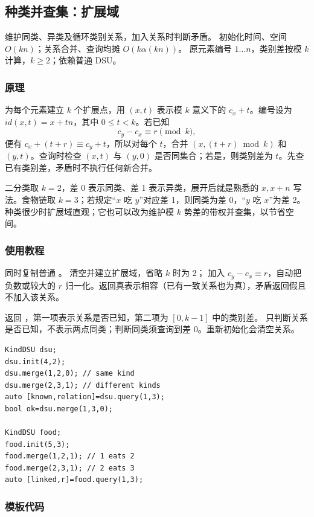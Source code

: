 \subsection{种类并查集：扩展域}
\label{ds:kind-dsu}
\AlgorithmInfo
    {维护同类、异类及循环类别关系，加入关系时判断矛盾。}
    {初始化时间、空间 $O(kn)$；关系合并、查询均摊 $O(k\alpha(kn))$。}
    {原元素编号 $1\ldots n$，类别差按模 $k$ 计算，$k\ge2$；依赖普通 DSU。}
\subsubsection*{原理}
为每个元素建立 $k$ 个扩展点，用 $(x,t)$ 表示模 $k$ 意义下的 $c_x+t$。编号设为 $id(x,t)=x+tn$，其中 $0\le t<k$。若已知
\[
 c_y-c_x\equiv r\pmod k,
\]
便有 $c_x+(t+r)\equiv c_y+t$，所以对每个 $t$，合并 $(x,(t+r)\bmod k)$ 和 $(y,t)$。查询时检查 $(x,t)$ 与 $(y,0)$ 是否同集合；若是，则类别差为 $t$。先查已有类别差，矛盾时不执行任何新合并。

二分类取 $k=2$，差 0 表示同类、差 1 表示异类，展开后就是熟悉的 $x,x+n$ 写法。食物链取 $k=3$；若规定“$x$ 吃 $y$”对应差 1，则同类为差 0，“$y$ 吃 $x$”为差 2。种类很少时扩展域直观；它也可以改为维护模 $k$ 势差的带权并查集，以节省空间。

\subsubsection*{使用教程}
同时复制普通 。 清空并建立扩展域，省略 $k$ 时为 2； 加入 $c_y-c_x\equiv r$，自动把负数或较大的 $r$ 归一化。返回真表示相容（已有一致关系也为真），矛盾返回假且不加入该关系。

 返回 ，第一项表示关系是否已知，第二项为 $[0,k-1]$ 中的类别差。 只判断关系是否已知，不表示两点同类；判断同类须查询到差 0。重新初始化会清空关系。
\begin{lstlisting}[style=mtycpp,numbers=none]
KindDSU dsu;
dsu.init(4,2);
dsu.merge(1,2,0); // same kind
dsu.merge(2,3,1); // different kinds
auto [known,relation]=dsu.query(1,3);
bool ok=dsu.merge(1,3,0);

KindDSU food;
food.init(5,3);
food.merge(1,2,1); // 1 eats 2
food.merge(2,3,1); // 2 eats 3
auto [linked,r]=food.query(1,3);
\end{lstlisting}
\subsubsection*{模板代码}
